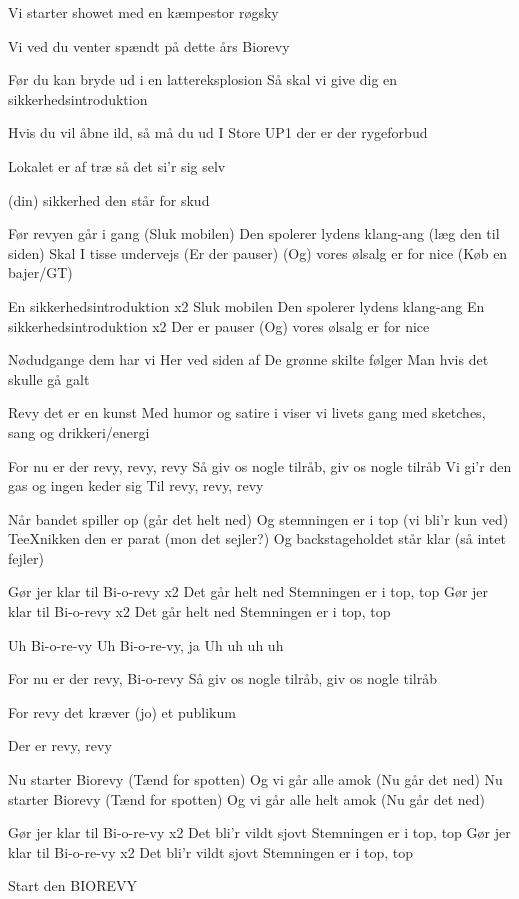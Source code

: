 \documentclass[a4paper,11pt]{article}
\begin{document}
\begin{song}
Vi starter showet med en kæmpestor røgsky

Vi ved du venter spændt på dette års Biorevy

Før du kan bryde ud i en lattereksplosion
Så skal vi give dig en sikkerhedsintroduktion


Hvis du vil åbne ild, så må du ud
I Store UP1 der er der rygeforbud

Lokalet er af træ så det si'r sig selv

(din) sikkerhed den står for skud

Før revyen går i gang
(Sluk mobilen)
Den spolerer lydens klang-ang
(læg den til siden) 
Skal I tisse undervejs
(Er der pauser)
(Og) vores ølsalg er for nice
(Køb en bajer/GT)

En sikkerhedsintroduktion x2
Sluk mobilen
Den spolerer lydens klang-ang
En sikkerhedsintroduktion x2
Der er pauser
(Og) vores ølsalg er for nice

Nødudgange dem har vi
Her ved siden af
De grønne skilte følger
Man hvis det skulle gå galt

Revy det er en kunst
Med humor og satire i
viser vi livets gang
med sketches, sang og drikkeri/energi 

For nu er der revy, revy, revy
Så giv os nogle tilråb, giv os nogle tilråb
Vi gi'r den gas og ingen keder sig
Til revy, revy, revy

Når bandet spiller op 
(går det helt ned)  
Og stemningen er i top
(vi bli'r kun ved)  
TeeXnikken den er parat
(mon det sejler?) 
Og backstageholdet står klar 
(så intet fejler) 

Gør jer klar til Bi-o-revy x2
Det går helt ned  
Stemningen er i top, top  
Gør jer klar til Bi-o-revy x2
Det går helt ned 
Stemningen er i top, top 

Uh Bi-o-re-vy
Uh Bi-o-re-vy, ja
Uh uh uh uh

For nu er der revy, Bi-o-revy
Så giv os nogle tilråb, giv os nogle tilråb

For revy det kræver (jo) et publikum

Der er revy, revy

Nu starter Biorevy
(Tænd for spotten)
Og vi går alle amok 
(Nu går det ned) 
Nu starter Biorevy
(Tænd for spotten)
Og vi går alle helt amok 
(Nu går det ned) 

Gør jer klar til Bi-o-re-vy x2
Det bli'r vildt sjovt  
Stemningen er i top, top  
Gør jer klar til Bi-o-re-vy x2
Det bli'r vildt sjovt 
Stemningen er i top, top 


Start den BIOREVY
\end{song}
\end{document}
